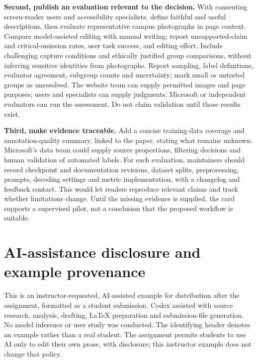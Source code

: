 \documentclass[11pt,letterpaper]{article}
\begin{document}
\textbf{Second, publish an evaluation relevant to the decision.} With consenting screen-reader users and accessibility specialists, define faithful and useful descriptions, then evaluate representative campus photographs in page context. Compare model-assisted editing with manual writing; report unsupported-claim and critical-omission rates, user task success, and editing effort. Include challenging capture conditions and ethically justified group comparisons, without inferring sensitive identities from photographs. Report sampling, label definitions, evaluator agreement, subgroup counts and uncertainty; mark small or untested groups as unresolved. The website team can supply permitted images and page purposes; users and specialists can supply judgments; Microsoft or independent evaluators can run the assessment. Do not claim validation until those results exist.

\textbf{Third, make evidence traceable.} Add a concise training-data coverage and annotation-quality summary, linked to the paper, stating what remains unknown. Microsoft's data team could supply source proportions, filtering decisions and human validation of automated labels. For each evaluation, maintainers should record checkpoint and documentation revisions, dataset splits, preprocessing, prompts, decoding settings and metric implementation, with a changelog and feedback contact. This would let readers reproduce relevant claims and track whether limitations change. Until the missing evidence is supplied, the card supports a supervised pilot, not a conclusion that the proposed workflow is suitable.

\clearpage
\begingroup
\raggedright


\endgroup

\section*{AI-assistance disclosure and example provenance}
This is an instructor-requested, AI-assisted example for distribution after the assignment, formatted as a student submission. Codex assisted with source research, analysis, drafting, LaTeX preparation and submission-file generation. No model inference or user study was conducted. The identifying header denotes an example rather than a real student. The assignment permits students to use AI only to edit their own prose, with disclosure; this instructor example does not change that policy.
\end{document}
